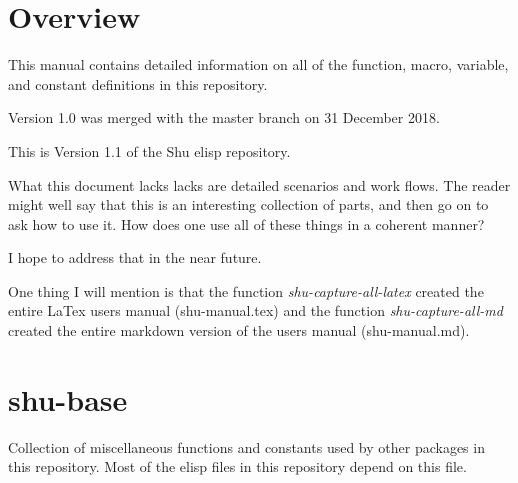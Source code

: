 



\section{Overview}


This manual contains detailed information on all of the function, macro,
variable, and constant definitions in this repository.

Version 1.0 was merged with the master branch on 31 December 2018.

This is Version 1.1 of the Shu elisp repository.

What this document lacks lacks are detailed scenarios and work flows.  The
reader might well say that this is an interesting collection of parts, and
then go on to ask how to use it.  How does one use all of these things in a
coherent manner?

I hope to address that in the near future.

One thing I will mention is that the function \emph{shu-capture-all-latex} created
the entire LaTex users manual (shu-manual.tex) and the function
\emph{shu-capture-all-md} created the entire markdown version of the users manual
(shu-manual.md).


\eject
\section{shu-base}


Collection of miscellaneous functions  and constants used by other
packages in this repository.  Most of the elisp files in this repository
depend on this file.


